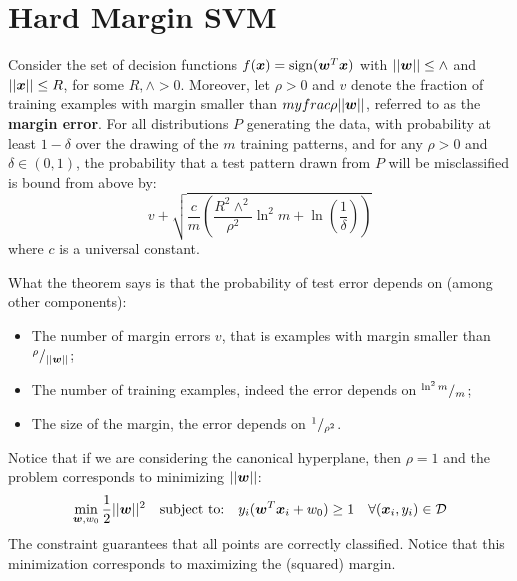 \section{Hard Margin SVM}
\begin{theorem}
  Consider the set of decision functions $f(\bm{x})=\text{sign}(\bm{w}^T\bm{x})$ with $\vert\vert\bm{w}\vert\vert\leq \wedge$ and $\vert\vert\bm{x}\vert\vert\leq R$, for some $R,\wedge>0$. Moreover, let $\rho>0$ and $v$ denote the fraction of training examples with margin smaller than $myfrac{\rho}{\vert\vert\bm{w}\vert\vert}$, referred to as the \textbf{margin error}. \newline
  For all distributions $P$ generating the data, with probability at least $1-\delta$ over the drawing of the $m$ training patterns, and for any $\rho>0$ and $\delta\in(0,1)$, the probability that a test pattern drawn from $P$ will be misclassified is bound from above by:
  \begin{equation}
    v+\sqrt{\frac{c}{m}\left(\frac{R^2\wedge^2}{\rho^2}\ln^2m+\ln\left(\frac{1}{\delta}\right)\right)}
    \label{eq:MarginErrorBound}
  \end{equation}
  where $c$ is a universal constant.
\end{theorem}
What the theorem says is that the probability of test error depends on (among other components):
\begin{itemize}
  \item The number of margin errors $v$, that is examples with margin smaller than ${}^{\rho}/_{\vert\vert\bm{w}\vert\vert}$;
  \item The number of training examples, indeed the error depends on ${}^{\ln^2m}/_{m}$;
  \item The size of the margin, the error depends on ${}^{1}/_{\rho^2}$.
\end{itemize}
Notice that if we are considering the canonical hyperplane, then $\rho=1$ and the problem corresponds to minimizing $\vert\vert\bm{w}\vert\vert$:
\[
  \min\limits_{\bm{w},w_0}\frac{1}{2}\vert\vert\bm{w}\vert\vert^2\quad\text{subject to:}\quad y_i(\bm{w}^T\bm{x}_i+w_0)\geq 1\quad\forall (\bm{x}_i,y_i)\in\mathcal{D}
\]
The constraint guarantees that all points are correctly classified. \newline
Notice that this minimization corresponds to maximizing the (squared) margin. 
%
%
